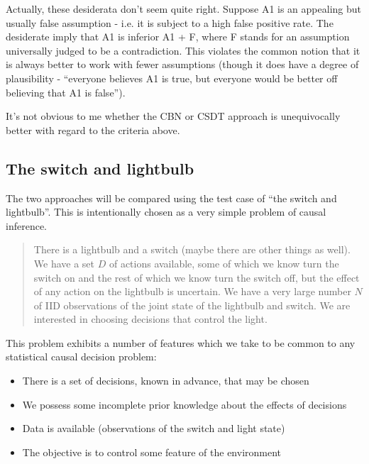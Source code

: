Actually, these desiderata don't seem quite right. Suppose A1 is an appealing but usually false assumption - i.e. it is subject to a high false positive rate. The desiderate imply that A1 is inferior A1 + F, where F stands for an assumption universally judged to be a contradiction. This violates the common notion that it is always better to work with fewer assumptions (though it does have a degree of plausibility - ``everyone believes A1 is true, but everyone would be better off believing that A1 is false'').

It's not obvious to me whether the CBN or CSDT approach is unequivocally better with regard to the criteria above.

\subsection{The switch and lightbulb}

The two approaches will be compared using the test case of ``the switch and lightbulb''. This is intentionally chosen as a very simple problem of causal inference.

\begin{quote}
	There is a lightbulb and a switch (maybe there are other things as well). We have a set $D$ of actions available, some of which we know turn the switch on and the rest of which we know turn the switch off, but the effect of any action on the lightbulb is uncertain. We have a very large number $N$ of IID observations of the joint state of the lightbulb and switch. We are interested in choosing decisions that control the light.
\end{quote}

This problem exhibits a number of features which we take to be common to any statistical causal decision problem:
\begin{itemize}
	\item There is a set of decisions, known in advance, that may be chosen
	\item We possess some incomplete prior knowledge about the effects of decisions
	\item Data is available (observations of the switch and light state)
	\item The objective is to control some feature of the environment
\end{itemize}

